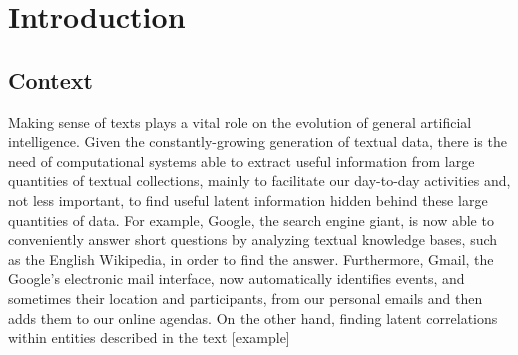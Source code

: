 \chapter{Introduction}
\label{chap:intro}
\minitoc
\section{Context}

Making sense of texts plays a vital role on the evolution of general artificial intelligence. Given the constantly-growing generation of textual data, there is the need of computational systems able to extract useful information from large quantities of textual collections, mainly to facilitate our day-to-day activities and, not less important, to find useful latent information hidden behind these large quantities of data. For example, Google, the search engine giant, is now able to conveniently answer short questions by analyzing textual knowledge bases, such as the English Wikipedia, in order to find the answer. Furthermore, Gmail, the Google's electronic mail interface, now  automatically identifies events, and sometimes their location and participants, from our personal emails and then adds  them to our online agendas. On the other hand, finding latent correlations within entities described in the text [example]

